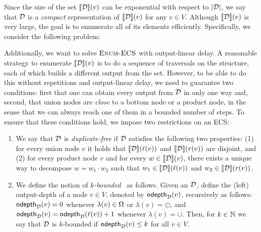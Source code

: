 Since the size of the set ${\llbracket{\mathcal{D}}\rrbracket}(v)$ can be exponential with respect to $|\mathcal{D}|$, we say that $\mathcal{D}$ is a \emph{compact} representation of ${\llbracket{\mathcal{D}}\rrbracket}(v)$ for any $v \in V$.
Although ${\llbracket{\mathcal{D}}\rrbracket}(v)$ is very large, the goal is to enumerate all of its elements efficiently. Specifically, we consider the following problem:
\vspace{.1cm}
\begin{center}
\end{center}
\vspace{.1cm}
Additionally, we want to solve $\textsc{Enum-ECS}$ with output-linear delay. 
A reasonable strategy to enumerate ${\llbracket{\mathcal{D}}\rrbracket}(v)$ is to do a sequence of traversals on the structure, each of which builds a different output from the set. 
However, to be able to do this without repetitions and output-linear delay, we need to guarantee two conditions: first that one can obtain every output from $\mathcal{D}$ in only one way and, second, that union nodes are {\it close} to a bottom node or a product node, in the sense that we can always reach one of them in a bounded number of steps. To ensure that these conditions hold, we impose two restrictions on an ECS:
\begin{enumerate}
	\item We say that $\mathcal{D}$ is \emph{duplicate-free} if $\mathcal{D}$ satisfies the following two properties: (1) for every union node $v$ it holds that ${\llbracket{\mathcal{D}}\rrbracket}(\ell(v))$ and ${\llbracket{\mathcal{D}}\rrbracket}(r(v))$ are disjoint, and (2) for every product node $v$ and for every $w \in {\llbracket{\mathcal{D}}\rrbracket}(v)$, there exists a unique way to decompose $w = w_1 \cdot w_2$ such that $w_1 \in {\llbracket{\mathcal{D}}\rrbracket}(\ell(v))$ and $w_2 \in {\llbracket{\mathcal{D}}\rrbracket}(r(v))$. 
	
	\item We define the notion of \emph{$k$-bounded}~\dsabbr{} as follows. 
	Given an \dsabbr{} $\mathcal{D}$, define the (left) output-depth of a node $v\in V$, denoted by $\mathsf{odepth}_{\mathcal{D}}(v)$, recursively as follows:
	$\mathsf{odepth}_{\mathcal{D}}(v) = 0$ whenever $\lambda(v)\in\Omega$ or $\lambda(v) = \odot$, and $\mathsf{odepth}_{\mathcal{D}}(v) = \mathsf{odepth}_{\mathcal{D}}(\ell(v))+1$ whenever $\lambda(v) = \cup$.
	Then, for $k\in\mathbb{N}$ we say that $\mathcal{D}$ is $k$-bounded if $\mathsf{odepth}_{\mathcal{D}}(v)\leq k$ for all $v\in V$.
\end{enumerate}



